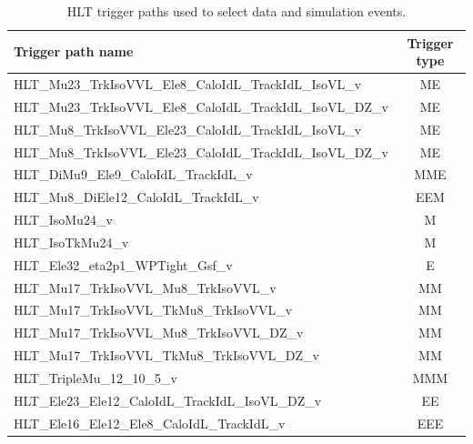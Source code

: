 \begin{table}[htbp]
	\centering
	\caption{HLT trigger paths used to select data and simulation events.}
	\begin{tabular}{lc}
		\toprule
		Trigger path name &  Trigger type \\ 
		\midrule
		HLT\_Mu23\_TrkIsoVVL\_Ele8\_CaloIdL\_TrackIdL\_IsoVL\_v &  ME \\ 
		HLT\_Mu23\_TrkIsoVVL\_Ele8\_CaloIdL\_TrackIdL\_IsoVL\_DZ\_v &  ME \\ 
		HLT\_Mu8\_TrkIsoVVL\_Ele23\_CaloIdL\_TrackIdL\_IsoVL\_v &  ME \\ 
		HLT\_Mu8\_TrkIsoVVL\_Ele23\_CaloIdL\_TrackIdL\_IsoVL\_DZ\_v &  ME \\ 
		HLT\_DiMu9\_Ele9\_CaloIdL\_TrackIdL\_v &  MME \\ 
		HLT\_Mu8\_DiEle12\_CaloIdL\_TrackIdL\_v &  EEM \B \\ 
		\hdashline
		HLT\_IsoMu24\_v &  M \T  \\ 
		HLT\_IsoTkMu24\_v &  M \B \\ 
		\hdashline
		HLT\_Ele32\_eta2p1\_WPTight\_Gsf\_v &  E \T \B  \\ 
		\hdashline
		HLT\_Mu17\_TrkIsoVVL\_Mu8\_TrkIsoVVL\_v &  MM \T \\ 
		HLT\_Mu17\_TrkIsoVVL\_TkMu8\_TrkIsoVVL\_v &  MM \\ 
		HLT\_Mu17\_TrkIsoVVL\_Mu8\_TrkIsoVVL\_DZ\_v &  MM \\ 
		HLT\_Mu17\_TrkIsoVVL\_TkMu8\_TrkIsoVVL\_DZ\_v &  MM \\ 
		HLT\_TripleMu\_12\_10\_5\_v &  MMM \B \\ 
		\hdashline
		HLT\_Ele23\_Ele12\_CaloIdL\_TrackIdL\_IsoVL\_DZ\_v &  EE \T \\ 
		HLT\_Ele16\_Ele12\_Ele8\_CaloIdL\_TrackIdL\_v &  EEE \\ 
		\bottomrule 
	\end{tabular} 
	\label{tab:Trigger}
\end{table}

